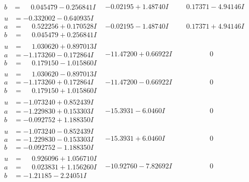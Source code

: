 \documentclass[1p]{elsarticle_modified}
\theoremstyle{definition}
\begin{document}
$$\begin{array}{c|c|c}
\begin{aligned}
b &= \phantom{-}0.045479 - 0.256841 I\end{aligned}
 & -0.02195 + 1.48740 I & \phantom{-}0.17371 - 4.94146 I \\ \hline\begin{aligned}
u &= -0.332002 - 0.640935 I \\
a &= \phantom{-}0.522256 + 0.170528 I \\
b &= \phantom{-}0.045479 + 0.256841 I\end{aligned}
 & -0.02195 - 1.48740 I & \phantom{-}0.17371 + 4.94146 I \\ \hline\begin{aligned}
u &= \phantom{-}1.030620 + 0.897013 I \\
a &= -1.173260 - 0.172864 I \\
b &= \phantom{-}0.179150 - 1.015860 I\end{aligned}
 & -11.47200 + 0.66922 I & \phantom{-0.000000 } 0 \\ \hline\begin{aligned}
u &= \phantom{-}1.030620 - 0.897013 I \\
a &= -1.173260 + 0.172864 I \\
b &= \phantom{-}0.179150 + 1.015860 I\end{aligned}
 & -11.47200 - 0.66922 I & \phantom{-0.000000 } 0 \\ \hline\begin{aligned}
u &= -1.073240 + 0.852439 I \\
a &= -1.229830 + 0.153303 I \\
b &= -0.092752 + 1.188350 I\end{aligned}
 & -15.3931 - 6.0460 I & \phantom{-0.000000 } 0 \\ \hline\begin{aligned}
u &= -1.073240 - 0.852439 I \\
a &= -1.229830 - 0.153303 I \\
b &= -0.092752 - 1.188350 I\end{aligned}
 & -15.3931 + 6.0460 I & \phantom{-0.000000 } 0 \\ \hline\begin{aligned}
u &= \phantom{-}0.926096 + 1.056710 I \\
a &= \phantom{-}0.023831 + 1.156260 I \\
b &= -1.21185 - 2.24051 I\end{aligned}
 & -10.92760 - 7.82692 I & \phantom{-0.000000 } 0 \\ \hline\begin{aligned}

\end{aligned}
\end{array}$$
\end{document}
